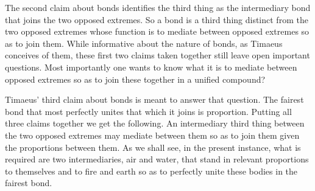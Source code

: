 The second claim about bonds identifies the third thing as the intermediary bond that joins the two opposed extremes. So a bond is a third thing distinct from the two opposed extremes whose function is to mediate between opposed extremes so as to join them. While informative about the nature of bonds, as Timaeus conceives of them, these first two claims taken together still leave open important questions. Most importantly one wants to know what it is to mediate between opposed extremes so as to join these together in a unified compound? 

Timaeus' third claim about bonds is meant to answer that question. The fairest bond that most perfectly unites that which it joins is proportion. Putting all three claims together we get the following. An intermediary third thing between the two opposed extremes may mediate between them so as to join them given the proportions between them. As we shall see, in the present instance, what is required are two intermediaries, air and water, that stand in relevant proportions to themselves and to fire and earth so as to perfectly unite these bodies in the fairest bond.



